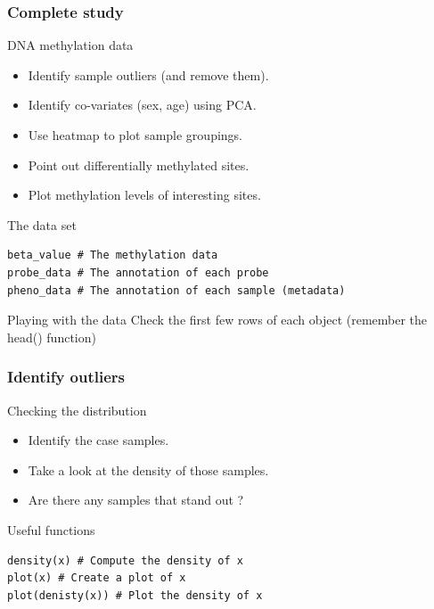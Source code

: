 \documentclass[10pt]{beamer}
\newenvironment{xframe}[2][]
  {\begin{frame}[fragile,environment=xframe,#1]
  \frametitle{#2}}
  {\end{frame}}
\begin{document}
\begin{xframe}{Complete study}
  \begin{block}{DNA methylation data}
    \begin{itemize}
    \item Identify sample outliers (and remove them).
    \item Identify co-variates (sex, age) using PCA.
    \item Use heatmap to plot sample groupings.
    \item Point out differentially methylated sites.
    \item Plot methylation levels of interesting sites.
    \end{itemize}
  \end{block}
  \begin{exampleblock}{The data set}
\begin{verbatim}
beta_value # The methylation data
probe_data # The annotation of each probe
pheno_data # The annotation of each sample (metadata)
\end{verbatim}  
  \end{exampleblock}
  
\begin{exampleblock}{Playing with the data}
Check the first few rows of each object (remember the head() function)
  \end{exampleblock}
\end{xframe}

\begin{xframe}{Identify outliers}
  \begin{block}{Checking the distribution}
    \begin{itemize}
      \item Identify the {\sf case} samples. 
      \item Take a look at the density of those samples.
      \item Are there any samples that stand out ?
    \end{itemize}
  \end{block}
  \begin{exampleblock}{Useful functions}
\begin{verbatim}
density(x) # Compute the density of x
plot(x) # Create a plot of x
plot(denisty(x)) # Plot the density of x
\end{verbatim}
  \end{exampleblock}
\end{xframe}
\end{document}
